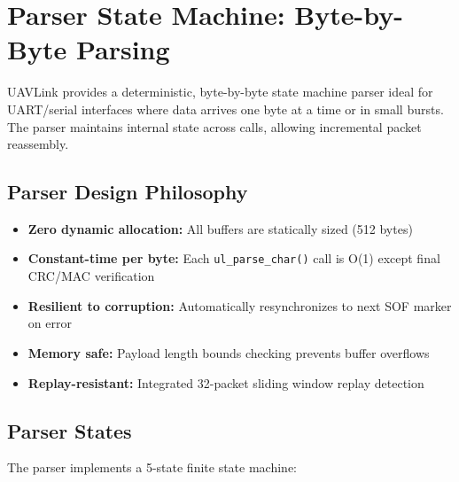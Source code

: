 \documentclass[11pt,a4paper]{article}
\begin{document}
\newpage
\section{Parser State Machine: Byte-by-Byte Parsing}

UAVLink provides a deterministic, byte-by-byte state machine parser ideal for UART/serial interfaces where data arrives one byte at a time or in small bursts. The parser maintains internal state across calls, allowing incremental packet reassembly.

\subsection{Parser Design Philosophy}

\begin{itemize}[noitemsep]
    \item \textbf{Zero dynamic allocation:} All buffers are statically sized (512 bytes)
    \item \textbf{Constant-time per byte:} Each \texttt{ul\_parse\_char()} call is O(1) except final CRC/MAC verification
    \item \textbf{Resilient to corruption:} Automatically resynchronizes to next SOF marker on error
    \item \textbf{Memory safe:} Payload length bounds checking prevents buffer overflows
    \item \textbf{Replay-resistant:} Integrated 32-packet sliding window replay detection
\end{itemize}

\subsection{Parser States}

The parser implements a 5-state finite state machine:
\end{document}
